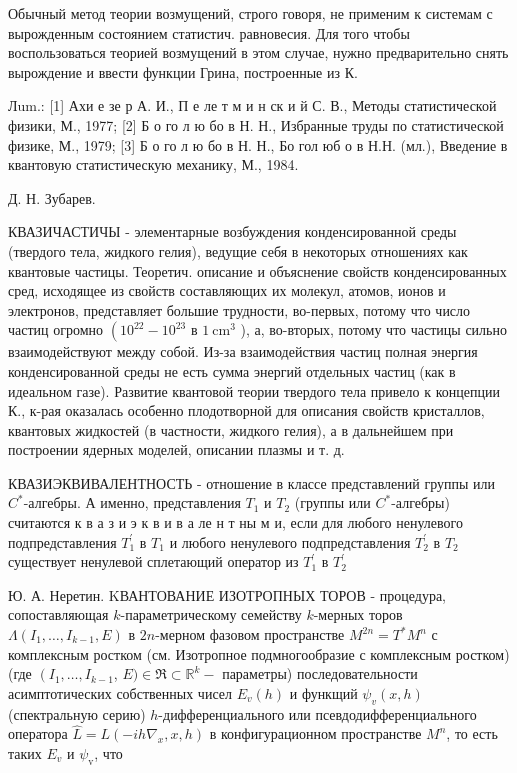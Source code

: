 \documentclass[10pt]{article}
\begin{document}
Обычный метод теории возмущений, строго говоря, не применим к системам с вырожденным состоянием статистич. равновесия. Для того чтобы воспользоваться теорией возмущений в этом случае, нужно предварительно снять вырождение и ввести функции Грина, построенные из К.



Лum.: [1] Ахи е зе р А. И., П е ле т м и н ск и й С. В., Методы статистической физики, М., 1977; [2] Б о го л ю бо в Н. Н., Избранные труды по статистической физике, М., 1979; [3] Б о го л ю бо в Н. Н., Бо гол юб о в Н.Н. (мл.), Введение в квантовую статистическую механику, М., 1984.



Д. Н. Зубарев.



КВАЗИЧАСТИЧЫ - элементарные возбуждения конденсированной среды (твердого тела, жидкого гелия), ведущие себя в некоторых отношениях как квантовые частицы. Теоретич. описание и объяснение свойств конденсированных сред, исходящее из свойств составляющих их молекул, атомов, ионов и электронов, представляет большие трудности, во-первых, потому что число частиц огромно $\left(10^{22}-10^{23}\right.$ в $1 \mathrm{~cm}^{3}$ ), а, во-вторых, потому что частицы сильно взаимодействуют между собой. Из-за взаимодействия частиц полная энергия конденсированной среды не есть сумма энергий отдельных частиц (как в идеальном газе). Развитие квантовой теории твердого тела привело к концепции К., к-рая оказалась особенно плодотворной для описания свойств кристаллов, квантовых жидкостей (в частности, жидкого гелия), а в дальнейшем при построении ядерных моделей, описании плазмы и т. д.



КВАЗИЭКВИВАЛЕНТНОСТЬ - отношение в классе представлений группы или $C^{*}$-алгебры. А именно, представления $T_{1}$ и $T_{2}$ (группы или $C^{*}$-алгебры) считаются к в а з и э к в и в а ле н т ны м и, если для любого ненулевого подпредставления $T_{1}^{\prime}$ в $T_{1}$ и любого ненулевого подпредставления $T_{2}^{\prime}$ в $T_{2}$ существует ненулевой сплетающий оператор из $T_{1}^{\prime}$ в $T_{2}^{\prime}$



Ю. А. Неретин. KВАНТОВАНИЕ ИЗОТРОПНЫХ ТОРОВ - процедура, сопоставляющая $k$-параметрическому семейству $k$-мерных торов $\Lambda\left(I_{1}, \ldots, I_{k-1}, E\right)$ в $2 n$-мерном фазовом пространстве $M^{2 n}=T^{*} M^{n}$ с комплексным ростком (см. Изотропное подмногообразие с комплексным ростком) (где $\left(I_{1}, \ldots, I_{k-1}\right.$, $E) \in \mathfrak{R} \subset \mathbb{R}^{k}-$ параметры) последовательности асимптотических собственных чисел $E_{v}(h)$ и функщий $\psi_{v}(x, h)$ (спектральную серию) $h$-дифференциального или псевдодифференциального оператора $\hat{L}=L\left(-i h \nabla_{x}, x, h\right)$ в конфигурационном пространстве $M^{n}$, то есть таких $E_{v}$ и $\psi_{\mathrm{v}}$, что
\end{document}
